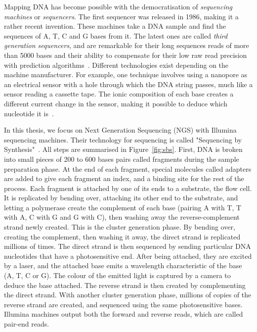  Mapping DNA has become possible with the democratisation of \emph{sequencing machines} or \emph{sequencers}. The first sequencer was released in 1986, making it a rather recent invention. These machines take a DNA sample and find the sequences of A, T, C and G bases from it. The latest ones are called \emph{third generation sequencers}, and are remarkable for their long sequences reads of more than 5000 bases and their ability to compensate for their low raw read precision with prediction algorithms~\cite{Lee048603}. Different technologies exist depending on the machine manufacturer. For example, one technique involves using a nanopore as an electrical sensor with a hole through which the DNA string passes, much like a sensor reading a cassette tape. The ionic composition of each base creates a different current change in the sensor, making it possible to deduce which nucleotide it is~\cite{Oxford:nanopore}.

In this thesis, we focus on Next Generation Sequencing (NGS) with Illumina sequencing machines. Their technology for sequencing is called "Sequencing by Synthesis"~\cite{illumina:sbs}. All steps are summarised in Figure~\ref{fig:sbs}. First, DNA is broken into small pieces of 200 to 600 bases pairs called fragments during the sample preparation phase. At the end of each fragment, special molecules called adapters are added to give each fragment an index, and a binding site for the rest of the process. Each fragment is attached by one of its ends to a substrate, the flow cell. It is replicated by bending over, attaching its other end to the substrate, and letting a polymerase create the complement of each base (pairing A with T, T with A, C with G and G with C), then washing away the reverse-complement strand newly created. This is the cluster generation phase. By bending over, creating the complement, then washing it away, the direct strand is replicated millions of times. The direct strand is then sequenced by sending particular DNA nucleotides that have a photosensitive end. After being attached, they are excited by a laser, and the attached base emits a wavelength characteristic of the base (A, T, C or G). The colour of the emitted light is captured by a camera to deduce the base attached. The reverse strand is then created by complementing the direct strand. With another cluster generation phase, millions of copies of the reverse strand are created, and sequenced using the same photosensitive bases. Illumina machines output both the forward and reverse reads, which are called pair-end reads.

